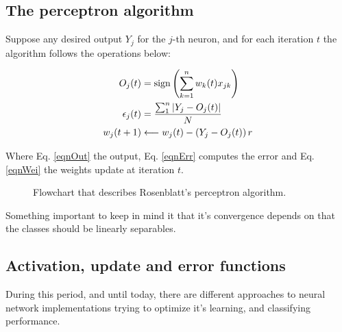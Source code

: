 \documentclass[10pt]{IEEEtran}
\begin{document}
\subsection{The perceptron algorithm}

Suppose any desired output $Y_j$ for the $j$-th neuron, and for each
iteration $t$ the algorithm follows the operations below:

\begin{align}
  O_j(t) &= \operatorname{sign}\left(\sum^{n}_{k=1} w_k(t) x_{jk}\right)
  \label{eqnOut} \\
  \epsilon_j(t)  &= \frac{\sum_{1}^{n} \left| Y_j - O_j(t) \right|}{N}
  \label{eqnErr} \\
  w_j(t+1) &\longleftarrow w_j(t) - \left(Y_j - O_j(t)\right)r
  \label{eqnWei}
\end{align}

Where Eq. \ref{eqnOut} the output, Eq. \ref{eqnErr} computes the error and
Eq. \ref{eqnWei} the weights update at iteration $t$.

\begin{figure}[!ht]
  \small%
  \centering%
  \caption{Flowchart that describes Rosenblatt's perceptron algorithm.}
  \label{flowchart_perceptron}
\end{figure}

Something important to keep in mind it that it's convergence depends on
that the classes should be linearly separables.


\subsection{Activation, update and error functions}

During this period, and until today, there are different approaches to
neural network implementations trying to optimize it's learning, and
classifying performance.
\end{document}
